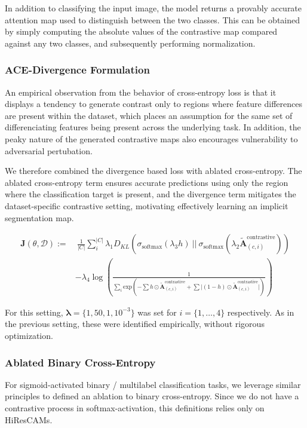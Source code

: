 \documentclass{article}
\theoremstyle{plain}
\theoremstyle{definition}
\theoremstyle{remark}
\newcommand{\contcam}[2]{\tilde{\mathcal{\bm{A}}}^{\text{contrastive}}_{(#1, #2)}}
\begin{document}
In addition to classifying the input image, the model returns a provably accurate attention map used to distinguish between the two classes. This can be obtained by simply computing the absolute values of the contrastive map compared against any two classes, and subsequently performing normalization.

\subsubsection{ACE-Divergence Formulation}

An empirical observation from the behavior of cross-entropy loss is that it displays a tendency to generate contrast only to regions where feature differences are present within the dataset, which places an assumption for the same set of differenciating features being present across the underlying task. In addition, the peaky nature of the generated contrastive maps also encourages vulnerability to adversarial pertubation.

We therefore combined the divergence based loss with ablated cross-entropy. The ablated cross-entropy term ensures accurate predictions using only the region where the classification target is present, and the divergence term mitigates the dataset-specific contrastive setting, motivating effectively learning an implicit segmentation map.

\begin{equation}
	\begin{split}
		\mathcal{\bm{J}}(\theta, \mathcal{D}) := &\ \frac{1}{|C|} \sum^{|C|}_{i} \lambda_1 D_{KL}(\sigma_{\text{softmax}}(\lambda_3 h)\ ||\ \sigma_{\text{softmax}}(\lambda_2 \contcam{c}{i})) \\
		&- \lambda_4 \log \left( \frac{1}{\sum_i \text{exp}\left({-\sum h \odot \contcam{c}{i} + \sum |(1-h) \odot \contcam{c}{i}}|\right)} \right)
	\end{split}
\end{equation}

For this setting, $\bm{\lambda} = \{1, 50, 1, 10^{-3}\}$ was set for $i = \{1, \ldots, 4\}$ respectively. As in the previous setting, these were identified empirically, without rigorous optimization.

\subsubsection{Ablated Binary Cross-Entropy}

For sigmoid-activated binary / multilabel classification tasks, we leverage similar principles to defined an ablation to binary cross-entropy. Since we do not have a contrastive process in softmax-activation, this definitions relies only on HiResCAMs.
\end{document}
